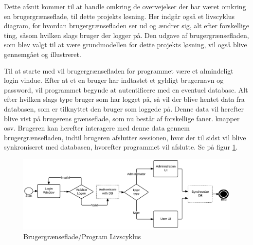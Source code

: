 Dette afsnit kommer til at handle omkring de overvejelser der har været omkring en brugergrænseflade, til dette projekts løsning. Her indgår også et livscyklus diagram, for hvordan brugergrænsefladen ser ud og ændrer sig, alt efter forskellige ting, såsom hvilken slags bruger der logger på. Den udgave af brugergrænsefladen, som blev valgt til at være grundmodellen for dette projekts løsning, vil også blive gennemgået og illustreret.

Til at starte med vil brugergrænsefladen for programmet være et almindeligt login vindue. Efter at et en bruger har indtastet et gyldigt brugernavn og password, vil programmet begynde at autentificere med en eventuel database. Alt efter hvilken slags type bruger som har logget på, så vil der blive hentet data fra databasen, som er tilknyttet den bruger som loggede på. Denne data vil herefter blive vist på brugerens grænseflade, som nu består af forskellige faner. knapper osv. Brugeren kan herefter interagere med denne data gennem brugergrænsefladen, indtil brugeren afslutter sessionen, hvor der til sidst vil blive synkroniseret med databasen, hvorefter programmet vil afslutte. Se på figur \ref{LifeCycle}.

\begin{figure}[H]
\centering
\includegraphics[width=1\textwidth]{Billeder/LifeCycle.png}
\caption{Brugergrænseflade/Program Livscyklus}
\label{LifeCycle}
\end{figure}